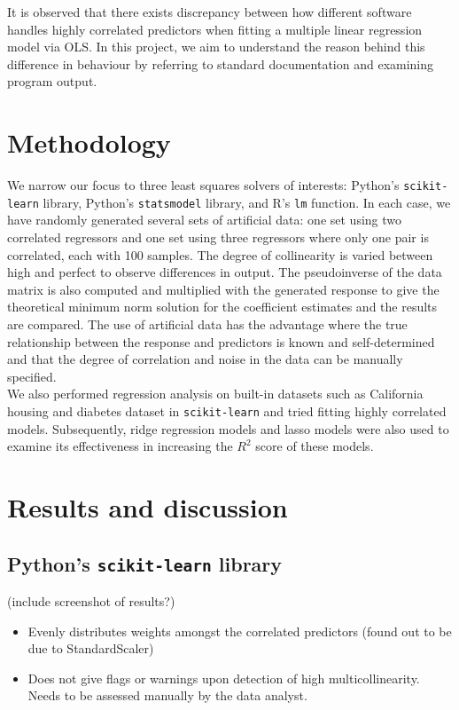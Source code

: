 \documentclass[12pt]{article}
\begin{document}
	It is observed that there exists discrepancy between how different software handles highly correlated predictors when fitting a multiple linear regression model via OLS. In this project, we aim to understand the reason behind this difference in behaviour by referring to standard documentation and examining program output. 
	
	\pagebreak
	
	\section{Methodology}
	
	We narrow our focus to three least squares solvers of interests: Python's \texttt{scikit-learn} library, Python's \texttt{statsmodel} library, and R's \texttt{lm} function. In each case, we have randomly generated several sets of artificial data: one set using two correlated regressors and one set using three regressors where only one pair is correlated, each with 100 samples. The degree of collinearity is varied between high and perfect to observe differences in output. The pseudoinverse of the data matrix is also computed and multiplied with the generated response to give the theoretical minimum norm solution for the coefficient estimates and the results are compared. The use of artificial data has the advantage where the true relationship between the response and predictors is known and self-determined and that the degree of correlation and noise in the data can be manually specified.\\
	
	We also performed regression analysis on built-in datasets such as California housing and diabetes dataset in \texttt{scikit-learn} and tried fitting highly correlated models. Subsequently, ridge regression models and lasso models were also used to examine its effectiveness in increasing the $R^2$ score of these models.
	
	
	\section{Results and discussion}
	\subsection{Python's \texttt{scikit-learn} library}
	(include screenshot of results?)
	\begin{itemize}
		\item Evenly distributes weights amongst the correlated predictors (found out to be due to StandardScaler)
		\item Does not give flags or warnings upon detection of high multicollinearity. Needs to be assessed manually by the data analyst.
	\end{itemize}
	
\end{document}
